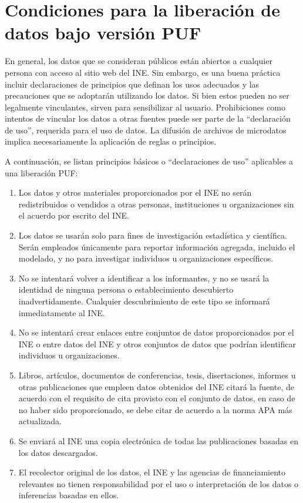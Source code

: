 \documentclass[
]{book}
\providecommand{\tightlist}{%
  \setlength{\itemsep}{0pt}\setlength{\parskip}{0pt}}
\theoremstyle{definition}
\theoremstyle{definition}
\theoremstyle{definition}
\theoremstyle{definition}
\theoremstyle{remark}
\begin{document}
\hypertarget{condiciones-para-la-liberaciuxf3n-de-datos-bajo-versiuxf3n-puf}{%
\section{Condiciones para la liberación de datos bajo versión PUF}\label{condiciones-para-la-liberaciuxf3n-de-datos-bajo-versiuxf3n-puf}}

En general, los datos que se consideran públicos están abiertos a cualquier persona con acceso al sitio web del INE. Sin embargo, es una buena práctica incluir declaraciones de principios que definan los usos adecuados y las precauciones que se adoptarán utilizando los datos. Si bien estos pueden no ser legalmente vinculantes, sirven para sensibilizar al usuario. Prohibiciones como intentos de vincular los datos a otras fuentes puede ser parte de la ``declaración de uso'', requerida para el uso de datos. La difusión de archivos de microdatos implica necesariamente la aplicación de reglas o principios.

A continuación, se listan principios básicos o ``declaraciones de uso'' aplicables a una liberación PUF:

\begin{enumerate}
\def\labelenumi{\arabic{enumi}.}
\tightlist
\item
  Los datos y otros materiales proporcionados por el INE no serán redistribuidos o vendidos a otras personas, instituciones u organizaciones sin el acuerdo por escrito del INE.
\item
  Los datos se usarán solo para fines de investigación estadística y científica. Serán empleados únicamente para reportar información agregada, incluido el modelado, y no para investigar individuos u organizaciones específicos.
\item
  No se intentará volver a identificar a los informantes, y no se usará la identidad de ninguna persona o establecimiento descubierto inadvertidamente. Cualquier descubrimiento de este tipo se informará inmediatamente al INE.
\item
  No se intentará crear enlaces entre conjuntos de datos proporcionados por el INE o entre datos del INE y otros conjuntos de datos que podrían identificar individuos u organizaciones.
\item
  Libros, artículos, documentos de conferencias, tesis, disertaciones, informes u otras publicaciones que empleen datos obtenidos del INE citará la fuente, de acuerdo con el requisito de cita provisto con el conjunto de datos, en caso de no haber sido proporcionado, se debe citar de acuerdo a la norma APA más actualizada.
\item
  Se enviará al INE una copia electrónica de todas las publicaciones basadas en los datos descargados.
\item
  El recolector original de los datos, el INE y las agencias de financiamiento relevantes no tienen responsabilidad por el uso o interpretación de los datos o inferencias basadas en ellos.
\end{enumerate}
\end{document}
